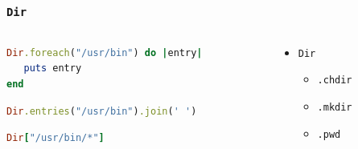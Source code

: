 \begin{frame}[fragile]\frametitle{\texttt{Dir}}

\begin{columns}[c]

\begin{column}{7cm}

\begin{lstlisting}[language=ruby, escapechar={^}]
Dir.foreach("/usr/bin") do |entry|
   puts entry
end
\end{lstlisting}

\pause

\begin{lstlisting}[language=ruby, escapechar={^}]
Dir.entries("/usr/bin").join(' ')
\end{lstlisting}

\pause

\begin{lstlisting}[language=ruby, escapechar={^}]
Dir["/usr/bin/*"]
\end{lstlisting}

\end{column}

\pause

\begin{column}{4cm}
\begin{itemize}

\item \texttt{Dir}

\begin{itemize}
\item \texttt{.chdir}
\item \texttt{.mkdir}
\item \texttt{.pwd}

\end{itemize}

\end{itemize}
\end{column}

\end{columns}

\end{frame}







